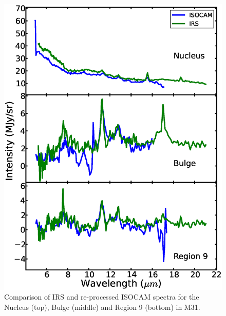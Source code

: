 \begin{figure}
\centering
\includegraphics[scale=0.35]{./fig7.eps}
\caption{ Comparison of  IRS and re-processed ISOCAM spectra for the Nucleus (top), Bulge (middle) and Region 9 (bottom) in M31.}
\label{ISOnIRS}
\end{figure}



